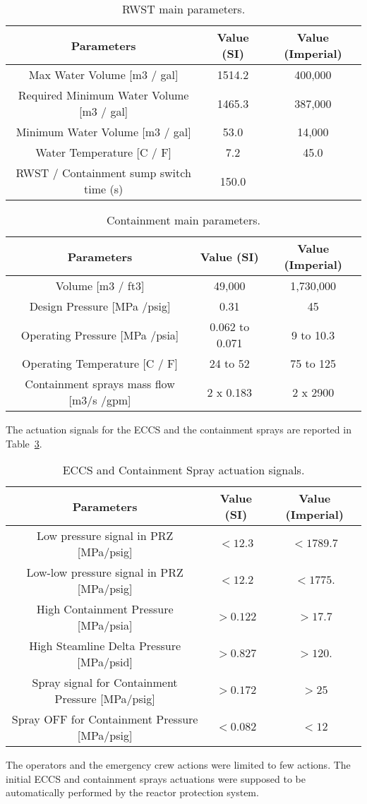 \begin{table}
  \caption{RWST main parameters.}
  \centering
  \begin{tabular}{c | c | c} 
    \hline 
    Parameters & Value (SI) & Value (Imperial) \\
    \hline 
    Max Water Volume [m3 / gal] & 1514.2 & 400,000 \\
    Required Minimum Water Volume [m3 / gal] & 1465.3 & 387,000 \\
    Minimum Water Volume  [m3 / gal] & 53.0 & 14,000 \\
    Water Temperature [C / F] & 7.2 & 45.0\\
    RWST / Containment sump switch time (s) & 150.0 & \\
    \hline 
  \end{tabular}
  \label{tab:dataRelap5_RWST}
\end{table}

\begin{table}
  \caption{Containment main parameters.}
  \centering
  \begin{tabular}{c | c | c} 
    \hline 
    Parameters & Value (SI) & Value (Imperial) \\
    \hline 
    Volume [m3 / ft3] & 49,000 & 1,730,000 \\
    Design Pressure [MPa /psig] & 0.31 & 45 \\
    Operating Pressure [MPa /psia] & 0.062 to 0.071 & 9 to 10.3 \\
    Operating Temperature [C / F] & 24 to 52 & 75 to 125 \\
    Containment sprays mass flow [m3/s /gpm] & 2 x 0.183 & 2 x 2900 \\
    \hline 
  \end{tabular}
  \label{tab:dataRelap5_cont}
\end{table}

The actuation signals for the ECCS and the containment sprays are reported in Table~\ref{tab:dataRelap5_signals}.

\begin{table}
  \caption{ECCS and Containment Spray actuation signals.}
  \centering
  \begin{tabular}{c | c | c} 
    \hline 
    Parameters & Value (SI) & Value (Imperial) \\
    \hline 
    Low pressure signal in PRZ [MPa/psig]  & $<12.3$ & $<1789.7$ \\
    Low-low pressure signal in PRZ [MPa/psig] & $<12.2$ & $<1775.$ \\
    High Containment Pressure [MPa/psia] & $>0.122$ & $>17.7$ \\
    High Steamline Delta Pressure [MPa/psid] & $>0.827$ & $>120.$ \\
    Spray signal for Containment Pressure [MPa/psig] & $>0.172$ & $>25$ \\
    Spray OFF for Containment Pressure [MPa/psig] & $<0.082$ & $<12$ \\
    \hline 
  \end{tabular}
  \label{tab:dataRelap5_signals}
\end{table}

The operators and the emergency crew actions were limited to few actions. The initial ECCS and containment sprays actuations were supposed to be automatically performed by the reactor protection system. 


